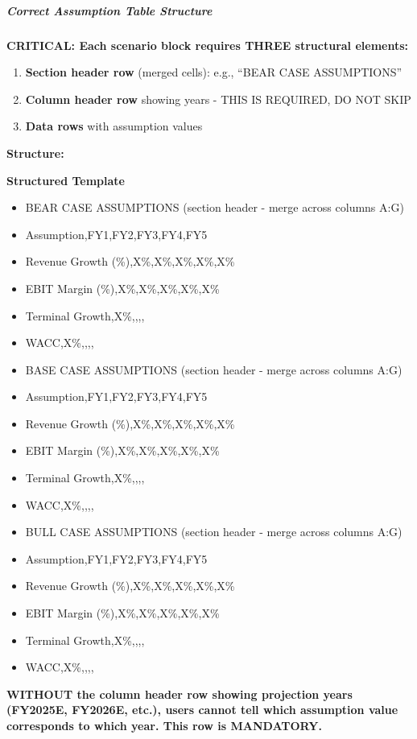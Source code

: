 \documentclass[11pt]{article}
\begin{document}
\subparagraph{Correct Assumption Table Structure}\mbox{}\par

\textbf{CRITICAL: Each scenario block requires THREE structural elements:}


\begin{enumerate}[leftmargin=*,itemsep=2pt,topsep=2pt]
\item {} \textbf{Section header row} (merged cells): e.g., ``BEAR CASE ASSUMPTIONS''
\item {} \textbf{Column header row} showing years - THIS IS REQUIRED, DO NOT SKIP
\item {} \textbf{Data rows} with assumption values
\end{enumerate}

\textbf{Structure:}

\textbf{Structured Template}
\begin{itemize}[leftmargin=*,itemsep=2pt,topsep=2pt]
\item {} BEAR CASE ASSUMPTIONS (section header - merge across columns A:G)
\item {} Assumption,FY1,FY2,FY3,FY4,FY5
\item {} Revenue Growth (\%),X\%,X\%,X\%,X\%,X\%
\item {} EBIT Margin (\%),X\%,X\%,X\%,X\%,X\%
\item {} Terminal Growth,X\%,,,,
\item {} WACC,X\%,,,,
\item {} BASE CASE ASSUMPTIONS (section header - merge across columns A:G)
\item {} Assumption,FY1,FY2,FY3,FY4,FY5
\item {} Revenue Growth (\%),X\%,X\%,X\%,X\%,X\%
\item {} EBIT Margin (\%),X\%,X\%,X\%,X\%,X\%
\item {} Terminal Growth,X\%,,,,
\item {} WACC,X\%,,,,
\item {} BULL CASE ASSUMPTIONS (section header - merge across columns A:G)
\item {} Assumption,FY1,FY2,FY3,FY4,FY5
\item {} Revenue Growth (\%),X\%,X\%,X\%,X\%,X\%
\item {} EBIT Margin (\%),X\%,X\%,X\%,X\%,X\%
\item {} Terminal Growth,X\%,,,,
\item {} WACC,X\%,,,,
\end{itemize}

\textbf{WITHOUT the column header row showing projection years (FY2025E, FY2026E, etc.), users cannot tell which assumption value corresponds to which year. This row is MANDATORY.}
\end{document}
